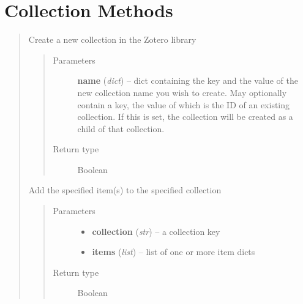 \documentclass[letterpaper,10pt,english]{sphinxmanual}
\begin{document}
\section{Collection Methods}
\label{index:collection-methods}\begin{quote}


\begin{fulllineitems}
\label{index:pyzotero.zotero.Zotero.create_collection}
Create a new collection in the Zotero library
\begin{quote}\begin{description}
\item[{Parameters}] \leavevmode
\textbf{name} (\emph{dict}) -- dict containing the key  and the value of the new collection name you wish to create. May optionally contain a  key, the value of which is the ID of an existing collection. If this is set, the collection will be created as a child of that collection.

\item[{Return type}] \leavevmode
Boolean

\end{description}\end{quote}

\end{fulllineitems}



\begin{fulllineitems}
\label{index:pyzotero.zotero.Zotero.addto_collection}
Add the specified item(s) to the specified collection
\begin{quote}\begin{description}
\item[{Parameters}] \leavevmode\begin{itemize}
\item {} 
\textbf{collection} (\emph{str}) -- a collection key

\item {} 
\textbf{items} (\emph{list}) -- list of one or more item dicts

\end{itemize}

\item[{Return type}] \leavevmode
Boolean


\end{description}
\end{quote}
\end{fulllineitems}
\end{quote}
\end{document}
